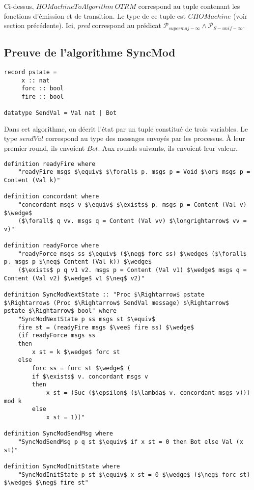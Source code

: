 \documentclass{article}
\begin{document}
Ci-dessus, $HOMachineToAlgorithm~OTRM$ correspond au tuple contenant les fonctions d'émission et de transition. Le type de ce tuple est $CHOMachine$ (voir section précédente).
Ici, \emph{pred} correspond au prédicat $\mathcal{P}_{supermaj-\infty} \wedge \mathcal{P}_{S-unif-\infty}$.

\subsection{Preuve de l'algorithme SyncMod}

\begin{lstlisting}
record pstate = 
     x :: nat
     forc :: bool
     fire :: bool
    
datatype SendVal = Val nat | Bot
\end{lstlisting}

Dans cet algorithme, on décrit l'état par un tuple constitué de trois variables.
Le type $sendVal$ correspond au type des messages envoyés par les processus.
À leur premier round, ils envoient	 $Bot$. Aux rounds suivants, ils envoient leur valeur.

\begin{lstlisting}[mathescape=true]
definition readyFire where
	"readyFire msgs $\equiv$ $\forall$ p. msgs p = Void $\or$ msgs p = Content (Val k)"

definition concordant where
	"concordant msgs v $\equiv$ $\exists$ p. msgs p = Content (Val v) $\wedge$
	($\forall$ q vv. msgs q = Content (Val vv) $\longrightarrow$ vv = v)"

definition readyForce where
	"readyForce msgs ss $\equiv$ ($\neg$ forc ss) $\wedge$ ($\forall$ p. msgs p $\neq$ Content (Val k)) $\wedge$ 
	($\exists$ p q v1 v2. msgs p = Content (Val v1) $\wedge$ msgs q = Content (Val v2) $\wedge$ v1 $\neq$ v2)"

definition SyncModNextState :: "Proc $\Rightarrow$ pstate $\Rightarrow$ (Proc $\Rightarrow$ SendVal message) $\Rightarrow$ pstate $\Rightarrow$ bool" where
	"SyncModNextState p ss msgs st $\equiv$
	fire st = (readyFire msgs $\vee$ fire ss) $\wedge$
	(if readyForce msgs ss
	then
		x st = k $\wedge$ forc st
	else
		forc ss = forc st $\wedge$ (
		if $\exists$ v. concordant msgs v
		then
			x st = (Suc ($\epsilon$ ($\lambda$ v. concordant msgs v))) mod k
		else
			x st = 1))"

definition SyncModSendMsg where
	"SyncModSendMsg p q st $\equiv$ if x st = 0 then Bot else Val (x st)"

definition SyncModInitState where 
	"SyncModInitState p st $\equiv$ x st = 0 $\wedge$ ($\neg$ forc st) $\wedge$ $\neg$ fire st"
\end{lstlisting}
\end{document}
